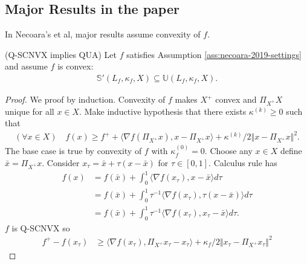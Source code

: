 \documentclass[12pt]{report}
\begin{document}
        \subsection{Major Results in the paper}
            In Necoara's et al, major results assume convexity of $f$. 
            \begin{theorem}(Q-SCNVX implies QUA)\label{thm:qscnvx-means-qua}
                Let $f$ satisfies Assumption \ref{ass:necoara-2019-settings} and assume $f$ is convex: 
                \begin{align*}
                    \mathbb S'(L_f, \kappa_f, X) \subseteq \mathbb U(L_f, \kappa_f, X). 
                \end{align*}
            \end{theorem}
            \begin{proof}
                We proof by induction. 
                Convexity of $f$ makes $X^+$ convex and $\Pi_{X^+}X$ unique for all $x \in X$. 
                Make inductive hypothesis that there exists $\kappa^{(k)} \ge 0$ such that 
                \begin{align*}
                    (\forall x \in X)\quad
                    f(x) \ge f^+ + \langle \nabla f(\Pi_{X^+}x), x - \Pi_{X^+}x\rangle 
                    + \kappa^{(k)}/2\Vert x - \Pi_{X^+}x \Vert^2. 
                \end{align*}
                The base case is true by convexity of $f$ with $\kappa_f^{(0)} = 0$. 
                Choose any $x \in X$ define $\bar x = \Pi_{X^+}x$. 
                Consider $x_\tau = \bar x + \tau(x - \bar x)$ for $\tau \in [0, 1]$. 
                Calculus rule has 
                \begin{align*}
                    f(x) &= 
                    f(\bar x) + \int_0^1 \langle \nabla f(x_\tau), x - \bar x\rangle d\tau
                    \\
                    &= 
                    f(\bar x) + \int_0^1 \tau^{-1}\langle \nabla f(x_\tau), \tau(x - \bar x)\rangle d\tau
                    \\
                    &= 
                    f(\bar x) + \int_0^1 \tau^{-1}\langle \nabla f(x_\tau), x_\tau - \bar x\rangle d\tau.
                \end{align*}
                $f$ is Q-SCNVX so
                \begin{align*}
                    f^+ - f(x_\tau) &\ge \langle \nabla f(x_\tau), \Pi_{X^+}x_\tau - x_\tau\rangle + 
                    \kappa_f/2 \Vert x_\tau - \Pi_{X^+}x_\tau\Vert^2

\end{align*}
\end{proof}
\end{document}
